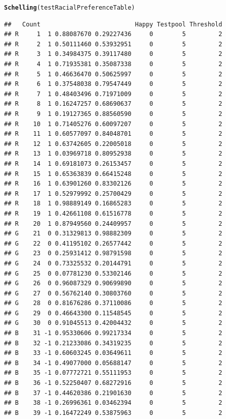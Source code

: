 \documentclass{article}\usepackage[]{graphicx}\usepackage[]{color}
\makeatletter
\newcommand{\hlstd}[1]{\textcolor[rgb]{0.345,0.345,0.345}{#1}}%
\newcommand{\hlkwd}[1]{\textcolor[rgb]{0.737,0.353,0.396}{\textbf{#1}}}%
\newenvironment{kframe}{%
 \def\at@end@of@kframe{}%
 \ifinner\ifhmode%
  \def\at@end@of@kframe{\end{minipage}}%
  \begin{minipage}{\columnwidth}%
 \fi\fi%
 \def\FrameCommand##1{\hskip\@totalleftmargin \hskip-\fboxsep
 \colorbox{shadecolor}{##1}\hskip-\fboxsep
     \hskip-\linewidth \hskip-\@totalleftmargin \hskip\columnwidth}%
 \MakeFramed {\advance\hsize-\width
   \@totalleftmargin\z@ \linewidth\hsize
   \@setminipage}}%
 {\par\unskip\endMakeFramed%
 \at@end@of@kframe}
\newenvironment{knitrout}{}{} %
\makeatother
\begin{document}
\begin{knitrout}
\begin{kframe}
\begin{alltt}
\hlkwd{Schelling}\hlstd{(testRacialPreferenceTable)}
\end{alltt}
\begin{verbatim}
##   Count                          Happy Testpool Threshold
## R     1  1 0.88087670 0.29227436     0        5         2
## R     2  1 0.50111460 0.53932951     0        5         2
## R     3  1 0.34984375 0.39117480     0        5         2
## R     4  1 0.71935381 0.35087338     0        5         2
## R     5  1 0.46636470 0.50625997     0        5         2
## R     6  1 0.37548038 0.79547449     0        5         2
## R     7  1 0.48403496 0.71971009     0        5         2
## R     8  1 0.16247257 0.68690637     0        5         2
## R     9  1 0.19127365 0.88560590     0        5         2
## R    10  1 0.71405276 0.60097207     0        5         2
## R    11  1 0.60577097 0.84048701     0        5         2
## R    12  1 0.63742605 0.22005018     0        5         2
## R    13  1 0.03969718 0.80952938     0        5         2
## R    14  1 0.69181073 0.26153457     0        5         2
## R    15  1 0.65363839 0.66415248     0        5         2
## R    16  1 0.63901260 0.83302126     0        5         2
## R    17  1 0.52979992 0.25700429     0        5         2
## R    18  1 0.98889149 0.16865283     0        5         2
## R    19  1 0.42661108 0.61516778     0        5         2
## R    20  1 0.87949560 0.24409957     0        5         2
## G    21  0 0.31329813 0.98882309     0        5         2
## G    22  0 0.41195102 0.26577442     0        5         2
## G    23  0 0.25931412 0.98791598     0        5         2
## G    24  0 0.73325532 0.20144791     0        5         2
## G    25  0 0.07781230 0.53302146     0        5         2
## G    26  0 0.96087329 0.90699890     0        5         2
## G    27  0 0.56762140 0.30803760     0        5         2
## G    28  0 0.81676286 0.37110086     0        5         2
## G    29  0 0.46643300 0.11548545     0        5         2
## G    30  0 0.91045513 0.42004432     0        5         2
## B    31 -1 0.95330606 0.99217334     0        5         2
## B    32 -1 0.21233086 0.34319235     0        5         2
## B    33 -1 0.60603245 0.03649611     0        5         2
## B    34 -1 0.49077000 0.05688147     0        5         2
## B    35 -1 0.07772721 0.55111953     0        5         2
## B    36 -1 0.52250407 0.68272916     0        5         2
## B    37 -1 0.44620386 0.21901630     0        5         2
## B    38 -1 0.26996361 0.03462394     0        5         2
## B    39 -1 0.16472249 0.53875963     0        5         2

\end{verbatim}
\end{kframe}
\end{knitrout}
\end{document}
